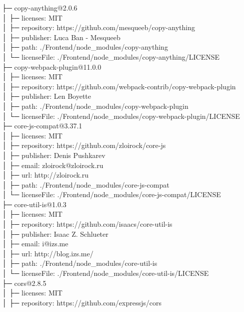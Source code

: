 \documentclass[
    paper=a4,
    twoside=false,
    parskip=half,
    listof=entryprefix,
    listof=totoc,
    index=totoc,
    bibliography=totoc,
    headsepline,
]{scrbook}
\begin{document}
    ├─ copy-anything@2.0.6\\
    │  ├─ licenses: MIT\\
    │  ├─ repository: https://github.com/mesqueeb/copy-anything\\
    │  ├─ publisher: Luca Ban - Mesqueeb\\
    │  ├─ path: ./Frontend/node\_modules/copy-anything\\
    │  └─ licenseFile: ./Frontend/node\_modules/copy-anything/LICENSE\\
    ├─ copy-webpack-plugin@11.0.0\\
    │  ├─ licenses: MIT\\
    │  ├─ repository: https://github.com/webpack-contrib/copy-webpack-plugin\\
    │  ├─ publisher: Len Boyette\\
    │  ├─ path: ./Frontend/node\_modules/copy-webpack-plugin\\
    │  └─ licenseFile: ./Frontend/node\_modules/copy-webpack-plugin/LICENSE\\
    ├─ core-js-compat@3.37.1\\
    │  ├─ licenses: MIT\\
    │  ├─ repository: https://github.com/zloirock/core-js\\
    │  ├─ publisher: Denis Pushkarev\\
    │  ├─ email: zloirock@zloirock.ru\\
    │  ├─ url: http://zloirock.ru\\
    │  ├─ path: ./Frontend/node\_modules/core-js-compat\\
    │  └─ licenseFile: ./Frontend/node\_modules/core-js-compat/LICENSE\\
    ├─ core-util-is@1.0.3\\
    │  ├─ licenses: MIT\\
    │  ├─ repository: https://github.com/isaacs/core-util-is\\
    │  ├─ publisher: Isaac Z. Schlueter\\
    │  ├─ email: i@izs.me\\
    │  ├─ url: http://blog.izs.me/\\
    │  ├─ path: ./Frontend/node\_modules/core-util-is\\
    │  └─ licenseFile: ./Frontend/node\_modules/core-util-is/LICENSE\\
    ├─ cors@2.8.5\\
    │  ├─ licenses: MIT\\
    │  ├─ repository: https://github.com/expressjs/cors\\
\end{document}

